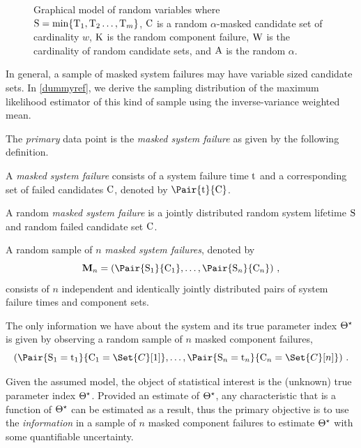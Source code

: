 \documentclass[../main.tex]{subfiles}
\begin{document}
\begin{figure}
	\label{fig:gen_model_simple}
	\caption{Graphical model of random variables where $\mathrm{S} = \min\{\mathrm{T}_1,\mathrm{T}_2\ldots,\mathrm{T}_m\}$, $\mathrm{C}$ is a random $\alpha$-masked candidate set of cardinality $w$, $\mathrm{K}$ is the random component failure, $\mathrm{W}$ is the cardinality of random candidate sets, and $\mathrm{A}$ is the random $\alpha$.}
	\begin{center}
		
	\end{center}
\end{figure}
In general, a sample of masked system failures may have variable sized candidate sets. In \cref{dummyref}, we derive the sampling distribution of the maximum likelihood estimator of this kind of sample using the inverse-variance weighted mean.

The \emph{primary} data point is the \emph{masked system failure} as given by the following definition.
\begin{definition}
A \emph{masked system failure} consists of a system failure time $\mathrm{t}$ and a corresponding set of failed candidates $\mathrm{C}$, denoted by $\Pair{\ti}{\cand}$.
\end{definition}
\begin{assumption}
\label{asm:cand_prob}
A random \emph{masked system failure} is a jointly distributed random system lifetime $\mathrm{S}$ and random failed candidate set $\mathrm{C}$.
\end{assumption}

\begin{assumption}
\label{def:msfs}
A random sample of $n$ \emph{masked system failures}, denoted by
\begin{equation}
\mfs = \left( \Pair{\sv_1}{\rvcand_1},\ldots,\Pair{\sv_n}{\rvcand_n}\right)\,,
\end{equation}
consists of $n$ independent and identically jointly distributed pairs of system failure times and component sets.
\end{assumption}

\begin{assumption}
The only information we have about the system and its true parameter index 
${\Theta}^{\star}$ is given by observing a random sample of $n$ masked component failures,
\begin{equation}
    \left(
    	\Pair{\sv_1=\ti_1}{\rvcand_1=\Set{C}[1]}, \ldots, 
    	\Pair{\sv_n=\ti_n}{\rvcand_n=\Set{C}[n]}
    \right)\,.
\end{equation}
\end{assumption}

Given the assumed model, the object of statistical interest is the (unknown) true parameter index ${\Theta}^{\star}$.
Provided an estimate of ${\Theta}^{\star}$, any characteristic that is a function of ${\Theta}^{\star}$ can be estimated as a result, thus the primary objective is to use the \emph{information} in a sample of $n$ masked component failures to estimate ${\Theta}^{\star}$ with some quantifiable uncertainty.
\end{document}

